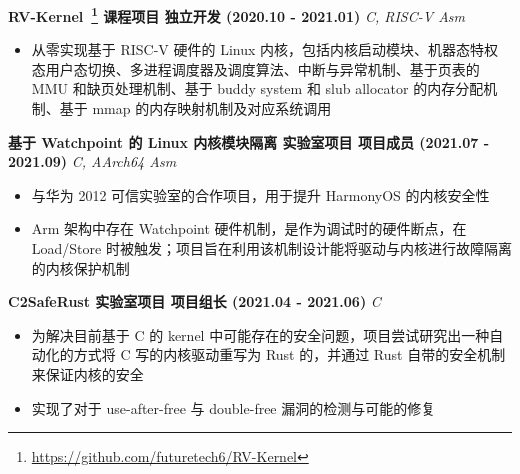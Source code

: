     \fi

    \noindent\textbf{RV-Kernel~\footnote{\url{https://github.com/futuretech6/RV-Kernel}} \textbar{} 课程项目 \textbar{} 独立开发 (2020.10 - 2021.01)} \hfill \textsl{C, RISC-V Asm}

    \begin{itemize}
        \item 从零实现基于 RISC-V 硬件的 Linux 内核，包括内核启动模块、机器态特权态用户态切换、多进程调度器及调度算法、中断与异常机制、基于页表的 MMU 和缺页处理机制、基于 buddy system 和 slub allocator 的内存分配机制、基于 mmap 的内存映射机制及对应系统调用
    \end{itemize}

    \noindent\textbf{基于 Watchpoint 的 Linux 内核模块隔离 \textbar{} 实验室项目 \textbar{} 项目成员 (2021.07 - 2021.09)} \hfill \textsl{C, AArch64 Asm}

    \begin{itemize}
        \item 与华为 2012 可信实验室的合作项目，用于提升 HarmonyOS 的内核安全性
        \item Arm 架构中存在 Watchpoint 硬件机制，是作为调试时的硬件断点，在 Load/Store 时被触发；项目旨在利用该机制设计能将驱动与内核进行故障隔离的内核保护机制
    \end{itemize}

    \ifdefined\qr\else



        \noindent\textbf{C2SafeRust \textbar{} 实验室项目 \textbar{} 项目组长 (2021.04 - 2021.06)} \hfill \textsl{C}

        \begin{itemize}
            \item 为解决目前基于 C 的 kernel 中可能存在的安全问题，项目尝试研究出一种自动化的方式将 C 写的内核驱动重写为 Rust 的，并通过 Rust 自带的安全机制来保证内核的安全
            \item 实现了对于 use-after-free 与 double-free 漏洞的检测与可能的修复
        \end{itemize}

    \fi

\fi
